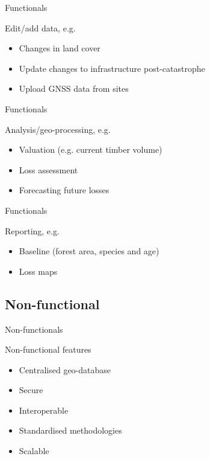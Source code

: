 \begin{frame}{Functionals}
	\begin{block}{Edit/add data, e.g.}
		\begin{itemize}
			\item Changes in land cover
			\item Update changes to infrastructure post-catastrophe
			\item Upload GNSS data from sites 
		\end{itemize}
	\end{block}
	
\end{frame}

\begin{frame}{Functionals}
	\begin{block}{Analysis/geo-processing, e.g.}
		\begin{itemize}
			\item Valuation (e.g. current timber volume)
			\item Loss assessment
			\item Forecasting future losses
		\end{itemize}
	\end{block}
	
\end{frame}

\begin{frame}{Functionals}
	\begin{block}{Reporting, e.g.}
		\begin{itemize}
			\item Baseline (forest area, species and age)
			\item Loss maps
		\end{itemize}
	\end{block}
	
\end{frame}

\subsection{Non-functional}
\begin{frame}{Non-functionals}
	\begin{block}{Non-functional features}
		\begin{itemize}
			\item Centralised geo-database
			\item Secure
			\item Interoperable
			\item Standardised methodologies
			\item Scalable

		\end{itemize}
	\end{block}
	
\end{frame}

